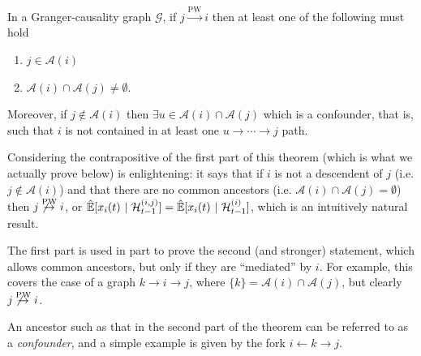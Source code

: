 \documentclass[12pt]{article}
\def\pwgc{\overset{\text{PW}}{\rightarrow}}  %
\def\gcg{\mathcal{G}}  %
\def\H{\mathcal{H}}  %
\newcommand{\linE}[2]{\hat{\E}[#1\ |\ #2]}  %
\newcommand{\anc}[1]{\mathcal{A}(#1)}  %
\newcommand{\gcgpath}[2]{#1 \rightarrow \cdots \rightarrow #2}  %
\begin{document}
\begin{proposition}
  \label{prop:ancestor_properties}
  In a Granger-causality graph $\gcg$, if $j \pwgc i$ then at least
  one of the following must hold

  \begin{enumerate}
    \item{$j \in \anc{i}$}
    \item{$\anc{i} \cap \anc{j} \ne \emptyset$.}
  \end{enumerate}

  Moreover, if $j \not\in \anc{i}$ then $\exists u \in \anc{i} \cap \anc{j}$ which is a confounder, that is, such that $i$ is not contained in at least one $\gcgpath{u}{j}$ path.
\end{proposition}

\begin{remark}
  Considering the contrapositive of the first part of this theorem (which is what we actually prove below) is enlightening: it says that if $i$ is not a descendent of $j$ (i.e. $j \not \in \anc{i}$) and that there are no common ancestors (i.e. $\anc{i} \cap \anc{j} = \emptyset$) then $j \not \pwgc i$, or $\linE{x_i(t)}{\H_{t - 1}^{(i, j)}} = \linE{x_i(t)}{\H_{t - 1}^{(i)}}$, which is an intuitively natural result.

  The first part is used in part to prove the second (and stronger) statement, which allows common ancestors, but only if they are ``mediated'' by $i$.  For example, this covers the case of a graph $k \rightarrow i \rightarrow j$, where $\{k\} = \anc{i} \cap \anc{j}$, but clearly $j \not \pwgc i$.

  An ancestor such as that in the second part of the theorem can be referred to as a \textit{confounder}, and a simple example is given by the fork $i \leftarrow k \rightarrow j$.
\end{remark}
\end{document}
